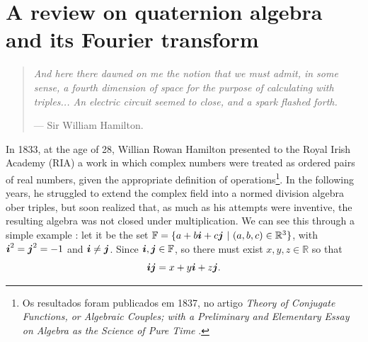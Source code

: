


\chapter{A review on quaternion algebra and its Fourier transform}
\label{ch:reviewQuat}

\begin{quotation}
\itshape
And here there dawned on me the notion that we must admit, in some sense, a fourth dimension of space for the purpose of calculating with triples... An electric circuit seemed to close, and a spark flashed forth.

\noindent --- Sir William Hamilton.
\end{quotation}


In 1833, at the age of 28, Willian Rowan Hamilton presented to the Royal Irish Academy (RIA) a work in which complex numbers were treated as ordered pairs of real numbers, given the appropriate definition of operations\footnote{Os resultados foram publicados em 1837, no artigo \emph{Theory of Conjugate Functions, or Algebraic Couples; with a Preliminary and Elementary Essay on Algebra as the Science of Pure Time} \cite{hamilton1837theory}.}. In the following years, he struggled to extend the complex field into a normed division algebra ober triples, but soon realized that, as much as his attempts were inventive, the resulting algebra was not closed under multiplication. We can see this through a simple example \cite{santos2011algebra}: let it be the set $\mathbb{F} = \{ a + b \boldsymbol{i} + c \boldsymbol{j}  \ | \ (a, b, c) \in \mathbb{R}^3\}$, with $\boldsymbol{i}^2 = \boldsymbol{j}^2 = -1$ and $\boldsymbol{i} \neq \boldsymbol{j}$. Since $\boldsymbol{i}, \boldsymbol{j} \in \mathbb{F}$, so there must exist $x, y, z \in \mathbb{R}$ so that
\begin{equation}
\boldsymbol{i} \boldsymbol{j} = x + y \boldsymbol{i} + z \boldsymbol{j}.
\label{eq:demonstration01}
\end{equation}

